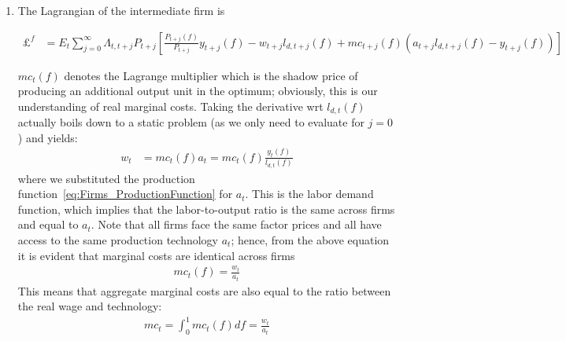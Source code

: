 \begin{enumerate}
\item The Lagrangian of the intermediate firm is
\begin{footnotesize}
\begin{align*}
	\pounds^f &= E_t \sum_{j=0}^{\infty}\Lambda_{t,t+j} P_{t+j} \left[\frac{P_{t+j}(f)}{P_{t+j}} y_{t+j}(f) - w_{t+j} l_{d,t+j}(f) + mc_{t+j}(f)\left(a_{t+j} l_{d,t+j}(f) - y_{t+j}(f)\right)\right]
\end{align*}
\end{footnotesize}
\(mc_t(f)\) denotes the Lagrange multiplier which is the shadow price of producing an additional output unit in the optimum;
  obviously, this is our understanding of real marginal costs.
Taking the derivative wrt \(l_{d,t}(f)\) actually boils down to a static problem (as we only need to evaluate for \(j=0\)) and yields:
\begin{align}
	w_t &= mc_t(f) a_t = mc_t(f) \frac{y_t(f)}{l_{d,t}(f)} \label{eq:Firms.Labor.Demand}
\end{align}
where we substituted the production function~\eqref{eq:Firms_ProductionFunction} for \(a_t\).
This is the labor demand function, which implies that the labor-to-output ratio is the same across firms and equal to \(a_t\).
Note that all firms face the same factor prices and all have access to the same production technology \(a_t\);
  hence, from the above equation it is evident that marginal costs are identical across firms
\begin{align}
	mc_t(f) = \frac{w_t}{a_t}\label{eq:Firms.Marginal.Costs}
\end{align}
This means that aggregate marginal costs are also equal to the ratio between the real wage and technology:
\begin{align*}
	mc_t = \int_0^1 mc_t(f) df = \frac{w_t}{a_t}
\end{align*}
	

\end{enumerate}
